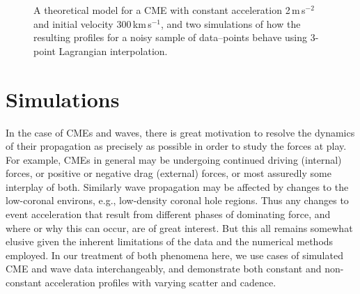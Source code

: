 \documentclass[structabstract]{aa}
\begin{document}
\begin{figure}
\caption{A theoretical model for a CME with constant acceleration 2\,m\,s$^{-2}$ and initial velocity 300\,km\,s$^{-1}$, and two simulations of how the resulting profiles for a noisy sample of data--points behave using 3-point Lagrangian interpolation.}
\label{sim_vels_thesis}
\end{figure}

\section{Simulations}
\label{sect:simul1}

In the case of CMEs and waves, there is great motivation to resolve the dynamics of their propagation as precisely as possible in order to study the forces at play. For example, CMEs in general may be undergoing continued driving (internal) forces, or positive or negative drag (external) forces, or most assuredly some interplay of both. Similarly wave propagation may be affected by changes to the low-coronal environs, e.g., low-density coronal hole regions. Thus any changes to event acceleration that result from different phases of dominating force, and where or why this can occur, are of great interest. But this all remains somewhat elusive given the inherent limitations of the data and the numerical methods employed. In our treatment of both phenomena here, we use cases of simulated CME and wave data interchangeably, and demonstrate both constant and non-constant acceleration profiles with varying scatter and cadence.
\end{document}
